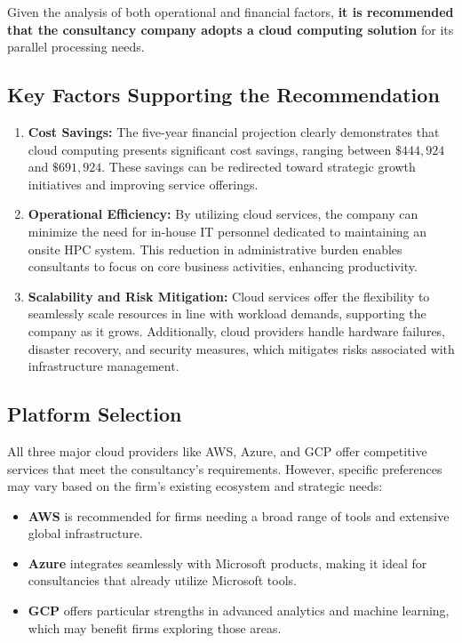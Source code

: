 \documentclass{article}
\begin{document}
Given the analysis of both operational and financial factors, \textbf{it is recommended that the consultancy company adopts a cloud computing solution} for its parallel processing needs.

\subsection{Key Factors Supporting the Recommendation}

\begin{enumerate}
    \item \textbf{Cost Savings:} The five-year financial projection clearly demonstrates that cloud computing presents significant cost savings, ranging between $\$444,924$ and $\$691,924$. These savings can be redirected toward strategic growth initiatives and improving service offerings.
    \item \textbf{Operational Efficiency:} By utilizing cloud services, the company can minimize the need for in-house IT personnel dedicated to maintaining an onsite HPC system. This reduction in administrative burden enables consultants to focus on core business activities, enhancing productivity.
    \item \textbf{Scalability and Risk Mitigation:} Cloud services offer the flexibility to seamlessly scale resources in line with workload demands, supporting the company as it grows. Additionally, cloud providers handle hardware failures, disaster recovery, and security measures, which mitigates risks associated with infrastructure management.
\end{enumerate}

\subsection{Platform Selection}

All three major cloud providers like AWS, Azure, and GCP offer competitive services that meet the consultancy's requirements. However, specific preferences may vary based on the firm's existing ecosystem and strategic needs:

\begin{itemize}
    \item \textbf{AWS} is recommended for firms needing a broad range of tools and extensive global infrastructure.
    \item \textbf{Azure} integrates seamlessly with Microsoft products, making it ideal for consultancies that already utilize Microsoft tools.
    \item \textbf{GCP} offers particular strengths in advanced analytics and machine learning, which may benefit firms exploring those areas.
\end{itemize}
\end{document}
